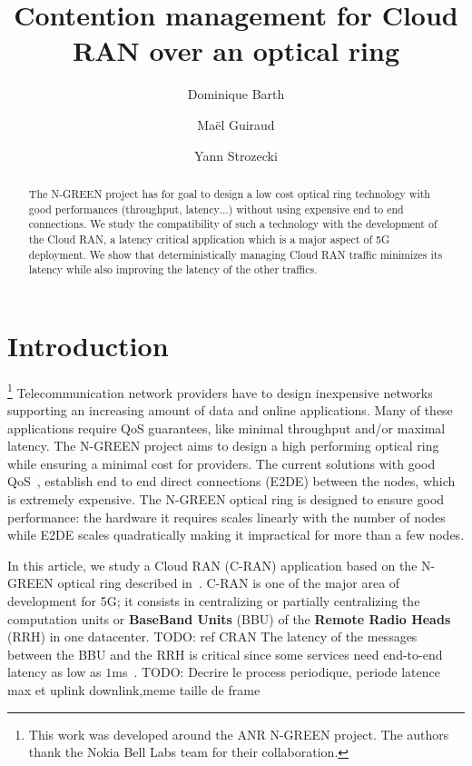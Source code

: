 \documentclass[10pt, conference, letterpaper]{IEEEtran}
\title{Contention management for Cloud RAN over an optical ring}
\author[1]{Dominique Barth}
\author[1,2]{Ma\"el Guiraud}
\author[1]{Yann Strozecki}
\affil[1]{David Laboratory, UVSQ}
\affil[2]{Nokia Bell Labs France}
\newcommand{\todo}[1]{{\color{red} TODO: {#1}}}
\begin{document}
\maketitle


\begin{abstract}
The N-GREEN project has for goal to design a low cost optical ring technology with good performances (throughput, latency$\dots$) without using expensive end to end connections. We study the compatibility of such a technology with the development of the Cloud RAN, a latency critical application which is a major aspect of 5G deployment. We show that deterministically managing Cloud RAN traffic minimizes its latency while also improving the latency of the other traffics. 

\end{abstract}


\section{Introduction}

\footnote{This work was developed around the ANR N-GREEN project. The authors thank the Nokia Bell Labs team for their collaboration.} Telecommunication network providers have to design inexpensive networks supporting an increasing amount of data and online applications. Many of these applications require QoS guarantees, like minimal throughput and/or  maximal latency. The N-GREEN project aims to design a high performing optical ring while ensuring a minimal cost for providers. The current solutions with good QoS~\cite{pizzinat2015things,tayq2017real}, establish end to end direct connections (E2DE) between the nodes, which is extremely expensive. The N-GREEN optical ring is designed to ensure good performance: the hardware it requires scales linearly with the number of nodes while E2DE scales quadratically making it impractical for more than a few nodes.

In this article, we study a Cloud RAN (C-RAN) application based on the N-GREEN optical ring described in~\cite{ngreenarchitecture,uscumlicscalable}. C-RAN is one of the major area of development for 5G; it consists in centralizing or partially centralizing the computation units or {\bf BaseBand Units} (BBU) of the {\bf Remote Radio Heads} (RRH) in one datacenter.\todo{ref CRAN} The latency of the messages between the BBU and the RRH is critical since some services need end-to-end latency as low as $1$ms~\cite{3gpp5g,boccardi2014five}. \todo{Decrire le process periodique, periode latence max et uplink downlink,meme taille de frame}
\end{document}
